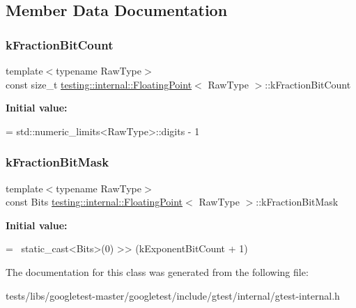 \subsection{Member Data Documentation}
\mbox{\label{classtesting_1_1internal_1_1FloatingPoint_a0b756a6d2a4f5f5b41ca79651c06c043}} 
\subsubsection{\texorpdfstring{k\+Fraction\+Bit\+Count}{kFractionBitCount}}
{\footnotesize\ttfamily template$<$typename Raw\+Type$>$ \\
const size\+\_\+t \hyperlink{classtesting_1_1internal_1_1FloatingPoint}{testing\+::internal\+::\+Floating\+Point}$<$ Raw\+Type $>$\+::k\+Fraction\+Bit\+Count\hspace{0.3cm}{\ttfamily [static]}}

{\bfseries Initial value\+:}
\begin{DoxyCode}
=
    std::numeric\_limits<RawType>::digits - 1
\end{DoxyCode}
\mbox{\label{classtesting_1_1internal_1_1FloatingPoint_a0ac75d4ffd24f14bca452abe8a718da1}} 
\subsubsection{\texorpdfstring{k\+Fraction\+Bit\+Mask}{kFractionBitMask}}
{\footnotesize\ttfamily template$<$typename Raw\+Type$>$ \\
const Bits \hyperlink{classtesting_1_1internal_1_1FloatingPoint}{testing\+::internal\+::\+Floating\+Point}$<$ Raw\+Type $>$\+::k\+Fraction\+Bit\+Mask\hspace{0.3cm}{\ttfamily [static]}}

{\bfseries Initial value\+:}
\begin{DoxyCode}
=
    ~static\_cast<Bits>(0) >> (kExponentBitCount + 1)
\end{DoxyCode}


The documentation for this class was generated from the following file\+:\begin{DoxyCompactItemize}
\item 
tests/libs/googletest-\/master/googletest/include/gtest/internal/gtest-\/internal.\+h\end{DoxyCompactItemize}
